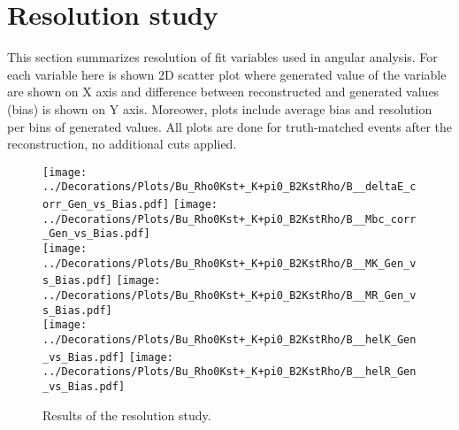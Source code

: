 \section{Resolution study}
\label{sec:Res}
This section summarizes resolution of fit variables used in angular analysis. For each variable here is shown 2D scatter plot where generated value of the variable are shown on X axis and difference between reconstructed and generated values (bias) is shown on Y axis. Moreower, plots include average bias and resolution per bins of generated values. All plots are done for truth-matched events after the reconstruction, no additional cuts applied.
\begin{figure}[p]
\centering
\texttt{[image: ../Decorations/Plots/Bu\_Rho0Kst+\_K+pi0\_B2KstRho/B\_\_deltaE\_corr\_Gen\_vs\_Bias.pdf]}\hfil
\texttt{[image: ../Decorations/Plots/Bu\_Rho0Kst+\_K+pi0\_B2KstRho/B\_\_Mbc\_corr\_Gen\_vs\_Bias.pdf]}\\
\texttt{[image: ../Decorations/Plots/Bu\_Rho0Kst+\_K+pi0\_B2KstRho/B\_\_MK\_Gen\_vs\_Bias.pdf]}\hfil
\texttt{[image: ../Decorations/Plots/Bu\_Rho0Kst+\_K+pi0\_B2KstRho/B\_\_MR\_Gen\_vs\_Bias.pdf]}\\
\texttt{[image: ../Decorations/Plots/Bu\_Rho0Kst+\_K+pi0\_B2KstRho/B\_\_helK\_Gen\_vs\_Bias.pdf]}\hfill
\texttt{[image: ../Decorations/Plots/Bu\_Rho0Kst+\_K+pi0\_B2KstRho/B\_\_helR\_Gen\_vs\_Bias.pdf]}\\
\caption{Results of the resolution study.}
\end{figure}
\clearpage
